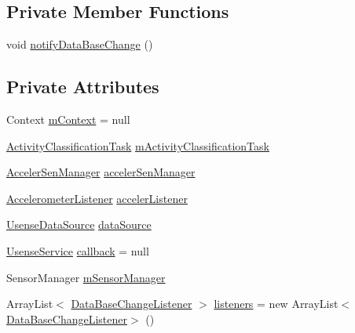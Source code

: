 \subsection*{Private Member Functions}
\begin{DoxyCompactItemize}
\item 
void \hyperlink{classcs_1_1usense_1_1accelerometer_1_1_accelerometer_pipeline_af1be6fde7ea76c3b837ce77768b5344c}{notify\+Data\+Base\+Change} ()
\end{DoxyCompactItemize}
\subsection*{Private Attributes}
\begin{DoxyCompactItemize}
\item 
Context \hyperlink{classcs_1_1usense_1_1accelerometer_1_1_accelerometer_pipeline_a3d0a51bf9ee496afd2b54f730465d7d0}{m\+Context} = null
\item 
\hyperlink{classcs_1_1usense_1_1accelerometer_1_1_accelerometer_pipeline_1_1_activity_classification_task}{Activity\+Classification\+Task} \hyperlink{classcs_1_1usense_1_1accelerometer_1_1_accelerometer_pipeline_ac13ce7a2cbfab63d4c51e53494776cb4}{m\+Activity\+Classification\+Task}
\item 
\hyperlink{classcs_1_1usense_1_1accelerometer_1_1_acceler_sen_manager}{Acceler\+Sen\+Manager} \hyperlink{classcs_1_1usense_1_1accelerometer_1_1_accelerometer_pipeline_a749cd2213718d81a6216d08fe0743a13}{acceler\+Sen\+Manager}
\item 
\hyperlink{interfacecs_1_1usense_1_1accelerometer_1_1_accelerometer_listener}{Accelerometer\+Listener} \hyperlink{classcs_1_1usense_1_1accelerometer_1_1_accelerometer_pipeline_a2321f3214edbb08357ffd5c847697e81}{acceler\+Listener}
\item 
\hyperlink{classcs_1_1usense_1_1db_1_1_usense_data_source}{Usense\+Data\+Source} \hyperlink{classcs_1_1usense_1_1accelerometer_1_1_accelerometer_pipeline_a7eb5f78b5db36060e6b97578b6677162}{data\+Source}
\item 
\hyperlink{classcs_1_1usense_1_1_usense_service}{Usense\+Service} \hyperlink{classcs_1_1usense_1_1accelerometer_1_1_accelerometer_pipeline_a2066e6ad6ad9c458c1a92ba3212618c9}{callback} = null
\item 
Sensor\+Manager \hyperlink{classcs_1_1usense_1_1accelerometer_1_1_accelerometer_pipeline_acf371fb0c0f08ab072a1c4dcaf142467}{m\+Sensor\+Manager}
\item 
Array\+List$<$ \hyperlink{interfacecs_1_1usense_1_1db_1_1_data_base_change_listener}{Data\+Base\+Change\+Listener} $>$ \hyperlink{classcs_1_1usense_1_1accelerometer_1_1_accelerometer_pipeline_a53be507081832940272735b836637663}{listeners} = new Array\+List$<$\hyperlink{interfacecs_1_1usense_1_1db_1_1_data_base_change_listener}{Data\+Base\+Change\+Listener}$>$ ()

\end{DoxyCompactItemize}

